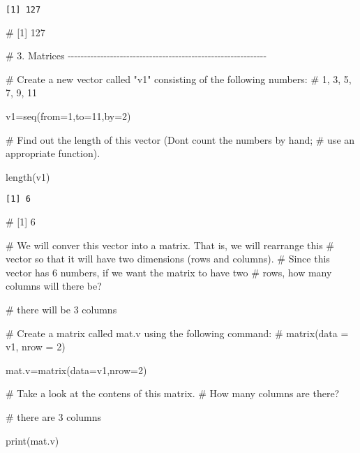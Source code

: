 \documentclass[
  letterpaper,
  DIV=11,
  numbers=noendperiod]{scrartcl}
\newenvironment{Shaded}{\begin{snugshade}}{\end{snugshade}}
\newcommand{\AttributeTok}[1]{\textcolor[rgb]{0.40,0.45,0.13}{#1}}
\newcommand{\CommentTok}[1]{\textcolor[rgb]{0.37,0.37,0.37}{#1}}
\newcommand{\DecValTok}[1]{\textcolor[rgb]{0.68,0.00,0.00}{#1}}
\newcommand{\FunctionTok}[1]{\textcolor[rgb]{0.28,0.35,0.67}{#1}}
\newcommand{\NormalTok}[1]{\textcolor[rgb]{0.00,0.23,0.31}{#1}}
\newcommand{\OtherTok}[1]{\textcolor[rgb]{0.00,0.23,0.31}{#1}}
\begin{document}
\begin{verbatim}
[1] 127
\end{verbatim}

\begin{Shaded}
\begin{Highlighting}[]
\CommentTok{\# [1] 127}


\CommentTok{\# 3. Matrices {-}{-}{-}{-}{-}{-}{-}{-}{-}{-}{-}{-}{-}{-}{-}{-}{-}{-}{-}{-}{-}{-}{-}{-}{-}{-}{-}{-}{-}{-}{-}{-}{-}{-}{-}{-}{-}{-}{-}{-}{-}{-}{-}{-}{-}{-}{-}{-}{-}{-}{-}{-}{-}{-}{-}{-}{-}{-}{-}{-}{-}}


\CommentTok{\# Create a new vector called "v1" consisting of the following numbers:}
\CommentTok{\# 1, 3, 5, 7, 9, 11}


\NormalTok{v1}\OtherTok{=}\FunctionTok{seq}\NormalTok{(}\AttributeTok{from=}\DecValTok{1}\NormalTok{,}\AttributeTok{to=}\DecValTok{11}\NormalTok{,}\AttributeTok{by=}\DecValTok{2}\NormalTok{)}


\CommentTok{\# Find out the length of this vector (Don\textquotesingle{}t count the numbers by hand; }
\CommentTok{\# use an appropriate function). }


\FunctionTok{length}\NormalTok{(v1)}
\end{Highlighting}
\end{Shaded}

\begin{verbatim}
[1] 6
\end{verbatim}

\begin{Shaded}
\begin{Highlighting}[]
\CommentTok{\# [1] 6}



\CommentTok{\# We will conver this vector into a matrix. That is, we will rearrange this}
\CommentTok{\# vector so that it will have two dimensions (rows and columns). }
\CommentTok{\# Since this vector has 6 numbers, if we want the matrix to have two }
\CommentTok{\# rows, how many columns will there be?}


\CommentTok{\# there will be 3 columns}




\CommentTok{\# Create a matrix called mat.v using the following command: }
\CommentTok{\# matrix(data = v1, nrow = 2)}


\NormalTok{mat.v}\OtherTok{=}\FunctionTok{matrix}\NormalTok{(}\AttributeTok{data=}\NormalTok{v1,}\AttributeTok{nrow=}\DecValTok{2}\NormalTok{)}


\CommentTok{\# Take a look at the contens of this matrix. }
\CommentTok{\# How many columns are there? }

\CommentTok{\# there are 3 columns}

\FunctionTok{print}\NormalTok{(mat.v)}
\end{Highlighting}
\end{Shaded}
\end{document}
